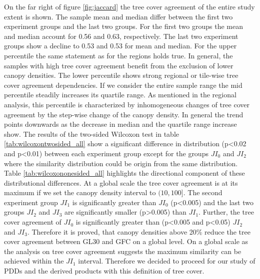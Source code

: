 			On the far right of figure \ref{fig:jaccard} the tree cover agreement of the entire study extent is shown. The sample mean and median differ between the first two experiment groups and the last two groups. For the first two groups the mean and median account for 0.56 and 0.63, respectively. The last two experiment groups show a decline to 0.53 and 0.53 for mean and median. For the upper percentile the same statement as for the regions holds true. In general, the samples with high tree cover agreement benefit from the exclusion of lower canopy densities. The lower percentile shows strong regional or tile-wise tree cover agreement dependencies. If we consider the entire sample range the mid percentile steadily increases its quartile range. As mentioned in the regional analysis, this percentile is characterized by inhomogeneous changes of tree cover agreement by the step-wise change of the canopy density. In general the trend points downwards as the decrease in median and the quartile range increase show. The results of the two-sided Wilcoxon test in table \ref{tab:wilcoxontwosided_all} show a significant difference in distribution (p<0.02 and p<0.01) between each experiment group except for the groups $JI_0$ and $JI_2$ where the similarity distribution could be origin from the same distribution. Table \ref{tab:wilcoxononesided_all} highlights the directional component of these distributional differences. At a global scale the tree cover agreement is at its maximum if we set the canopy density interval to $(10,100]$. The second experiment group $JI_1$ is significantly greater than $JI_0$ (p<0.005) and the last two groups $JI_2$ and $JI_3$ are significantly smaller (p>0.005) than $JI_1$. Further, the tree cover agreement of $JI_0$ is significantly greater than (p<0.005 and p<0.05) $JI_2$ and $JI_3$. Therefore it is proved, that canopy densities above 20\% reduce the tree cover agreement between \ac{GL30} and \ac{GFC} on a global level. On a global scale as the analysis on tree cover agreement suggests the maximum similarity can be achieved within the $JI_1$ interval. Therefore we decided to proceed for our study of \acp{PDD} and the derived products with this definition of tree cover.
